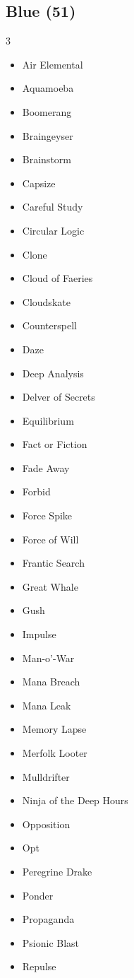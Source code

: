 \documentclass[11pt]{article}
\begin{document}
\subsection*{Blue (51)}
\begin{multicols}{3}
\footnotesize
\begin{itemize}[leftmargin=1em,itemsep=0pt,parsep=0pt]
\item Air Elemental
\item Aquamoeba
\item Boomerang
\item Braingeyser
\item Brainstorm
\item Capsize
\item Careful Study
\item Circular Logic
\item Clone
\item Cloud of Faeries
\item Cloudskate
\item Counterspell
\item Daze
\item Deep Analysis
\item Delver of Secrets
\item Equilibrium
\item Fact or Fiction
\item Fade Away
\item Forbid
\item Force Spike
\item Force of Will
\item Frantic Search
\item Great Whale
\item Gush
\item Impulse
\item Man-o'-War
\item Mana Breach
\item Mana Leak
\item Memory Lapse
\item Merfolk Looter
\item Mulldrifter
\item Ninja of the Deep Hours
\item Opposition
\item Opt
\item Peregrine Drake
\item Ponder
\item Propaganda
\item Psionic Blast
\item Repulse

\end{itemize}
\end{multicols}
\end{document}
